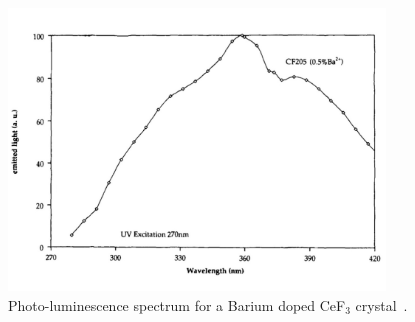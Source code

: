 \documentclass[a4paper,11pt]{article}
\begin{document}
\begin{figure}[ht]
\begin{center}
      \includegraphics[width=10cm]{Figures/SpectrumCeF3.pdf}
\caption{\small Photo-luminescence spectrum for a Barium doped CeF$_3$ crystal~\cite{r-EACEF3}.}
    \label{fig:cef3spectrum}
\end{center}
\end{figure}
\end{document}

